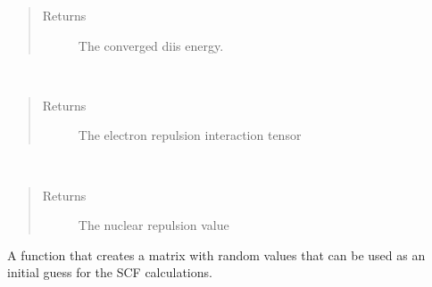 \documentclass[letterpaper,10pt,english]{sphinxmanual}
\begin{document}
\begin{fulllineitems}
\begin{fulllineitems}
\begin{quote}
\begin{description}
\begin{itemize}
\end{itemize}

\item[{Returns}] \leavevmode
The converged diis energy.

\end{description}\end{quote}

\end{fulllineitems}


\begin{fulllineitems}
\label{\detokenize{cUHF_b:hf.cUHF_b.CUHF.get_two_e}}~\begin{quote}\begin{description}
\item[{Returns}] \leavevmode
The electron repulsion interaction tensor

\end{description}\end{quote}

\end{fulllineitems}


\begin{fulllineitems}
\label{\detokenize{cUHF_b:hf.cUHF_b.CUHF.nuc_rep}}~\begin{quote}\begin{description}
\item[{Returns}] \leavevmode
The nuclear repulsion value

\end{description}\end{quote}

\end{fulllineitems}


\begin{fulllineitems}
\label{\detokenize{cUHF_b:hf.cUHF_b.CUHF.random_guess}}
A function that creates a matrix with random values that can be used as an initial guess
for the SCF calculations.


\end{fulllineitems}
\end{fulllineitems}
\end{document}
